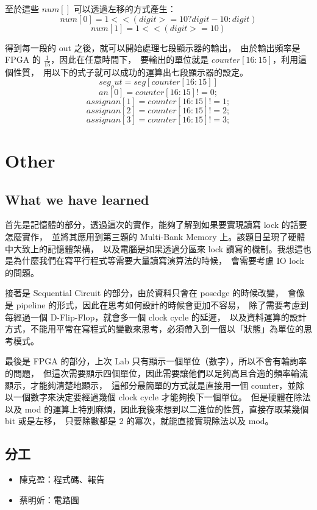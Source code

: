 \documentclass[10.5pt,compsoc,UTF8]{CjC}
\theoremstyle{mystyle}
\begin{document}
至於這些 $num[]$ 可以透過左移的方式產生：
$$num[0] = 1 << (digit >= 10 ? digit - 10 : digit)$$
$$num[1] = 1 << (digit >= 10)$$

得到每一段的 out 之後，就可以開始處理七段顯示器的輸出，\
由於輸出頻率是 FPGA 的 $\frac{1}{15}$，因此在任意時間下，\
要輸出的單位就是 $counter[16:15]$，利用這個性質，\
用以下的式子就可以成功的運算出七段顯示器的設定。
$$seg_out = seg[counter[16:15]]$$
$$an[0] = counter[16:15] != 0;$$
$$assign an[1] = counter[16:15] != 1;$$
$$assign an[2] = counter[16:15] != 2;$$
$$assign an[3] = counter[16:15] != 3;$$

\section{Other}
\subsection*{What we have learned}
首先是記憶體的部分，透過這次的實作，能夠了解到如果要實現讀寫 lock 的話要怎麼實作，\
並將其應用到第三題的 Multi-Bank Memory 上。該題目呈現了硬體中大致上的記憶體架構，\
以及電腦是如果透過分區來 lock 讀寫的機制。我想這也是為什麼我們在寫平行程式等需要大量讀寫演算法的時候，\
會需要考慮 IO lock 的問題。
\par
接著是 Sequential Circuit 的部分，由於資料只會在 posedge 的時候改變，\
會像是 pipeline 的形式，因此在思考如何設計的時候會更加不容易，\
除了需要考慮到每經過一個 D-Flip-Flop，就會多一個 clock cycle 的延遲，\
以及資料運算的設計方式，不能用平常在寫程式的變數來思考，必須帶入到一個以「狀態」為單位的思考模式。
\par
最後是 FPGA 的部分，上次 Lab 只有顯示一個單位（數字），所以不會有輪詢率的問題，\
但這次需要顯示四個單位，因此需要讓他們以足夠高且合適的頻率輪流顯示，才能夠清楚地顯示，\
這部分最簡單的方式就是直接用一個 counter，並除以一個數字來決定要經過幾個 clock cycle 才能夠換下一個單位。\
但是硬體在除法以及 mod 的運算上特別麻煩，因此我後來想到以二進位的性質，直接存取某幾個 bit 或是左移，\
只要除數都是 2 的冪次，就能直接實現除法以及 mod。

\subsection*{分工}
\begin{itemize}
  \item 陳克盈：程式碼、報告
  \item 蔡明妡：電路圖
\end{itemize}
\end{document}
